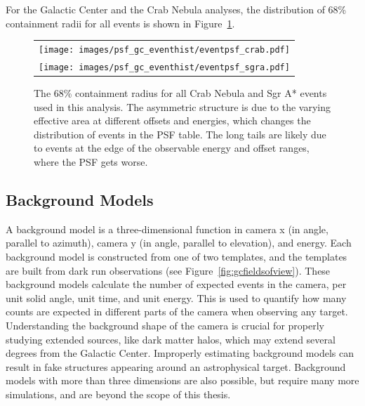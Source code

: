     For the Galactic Center and the Crab Nebula analyses, the distribution of 68\% containment radii for all events is shown in Figure~\ref{fig:gc_psf_hist}.

    \begin{figure}[!hb]
      \centering
      \begin{tabular}{c}
        \texttt{[image: images/psf\_gc\_eventhist/eventpsf\_crab.pdf]} \\
        \texttt{[image: images/psf\_gc\_eventhist/eventpsf\_sgra.pdf]}
      \end{tabular}
      \caption[Crab and Galactic Center Event PSFs]{
        The 68\% containment radius for all Crab Nebula and Sgr A* events used in this analysis.
        The asymmetric structure is due to the varying effective area at different offsets and energies, which changes the distribution of events in the PSF table.
        The long tails are likely due to events at the edge of the observable energy and offset ranges, where the PSF gets worse.
      }
      \label{fig:gc_psf_hist}
    \end{figure}
  
  \FloatBarrier
  
  \subsection{Background Models}\label{background_production}
  
    A background model is a three-dimensional function in camera x (in angle, parallel to azimuth), camera y (in angle, parallel to elevation), and energy.
    Each background model is constructed from one of two templates, and the templates are built from dark run observations (see Figure~\ref{fig:gcfieldsofview}).
    These background models calculate the number of expected events in the camera, per unit solid angle, unit time, and unit energy.
    This is used to quantify how many counts are expected in different parts of the camera when observing any target.
    Understanding the background shape of the camera is crucial for properly studying extended sources, like dark matter halos, which may extend several degrees from the Galactic Center.
    Improperly estimating background models can result in fake structures appearing around an astrophysical target.
    Background models with more than three dimensions are also possible, but require many more simulations, and are beyond the scope of this thesis.
    
